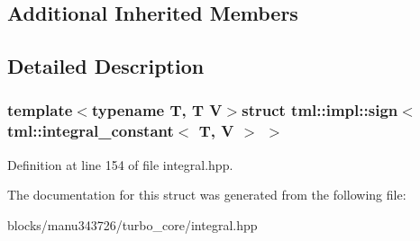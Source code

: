 \subsection*{Additional Inherited Members}


\subsection{Detailed Description}
\subsubsection*{template$<$typename T, T V$>$struct tml\+::impl\+::sign$<$ tml\+::integral\+\_\+constant$<$ T, V $>$ $>$}



Definition at line 154 of file integral.\+hpp.



The documentation for this struct was generated from the following file\+:\begin{DoxyCompactItemize}
\item 
blocks/manu343726/turbo\+\_\+core/integral.\+hpp\end{DoxyCompactItemize}
